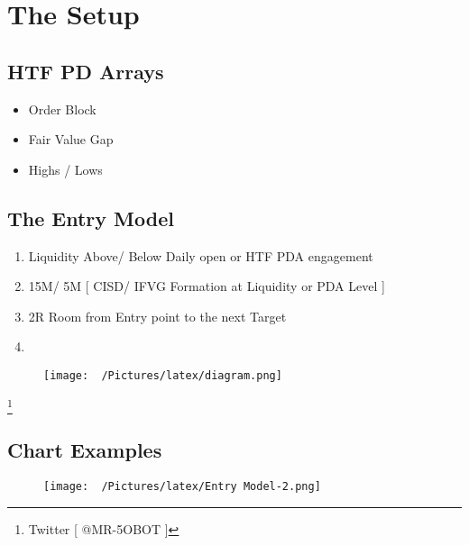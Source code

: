 \documentclass{article}
\begin{document}
\newpage
\section{The Setup}
\vspace{0.3cm}
\subsection{HTF PD Arrays}

\vspace{0.3cm}
\begin{itemize}
      \item Order Block
      \item Fair Value Gap
      \item Highs / Lows
\end{itemize}

\vspace{.1cm}
\subsection{The Entry Model}
\vspace{.3cm}

\begin{enumerate}
    \item Liquidity Above/ Below Daily open or HTF PDA engagement
    \item 15M/ 5M [ CISD/ IFVG Formation at Liquidity or PDA Level ] 
    \item 2R Room from Entry point to the next Target
    \item 
\end{enumerate}

\vspace{1cm}
\begin{figure}[h!]
  \begin{center}
\begin{adjustbox}{width=1.1\textwidth,center}
  \texttt{[image: ~/Pictures/latex/diagram.png]}
\end{adjustbox}
  \end{center}
\end{figure}
\footnote{Twitter [ @MR-5OBOT ]}
\newpage


\centering \subsection{Chart Examples}

\begin{figure}[h!]
\begin{adjustbox}{width=1.15\textwidth,center}
  \texttt{[image: ~/Pictures/latex/Entry Model-2.png]}
\end{adjustbox}
  \label{fig:image}
\end{figure}
\end{document}
